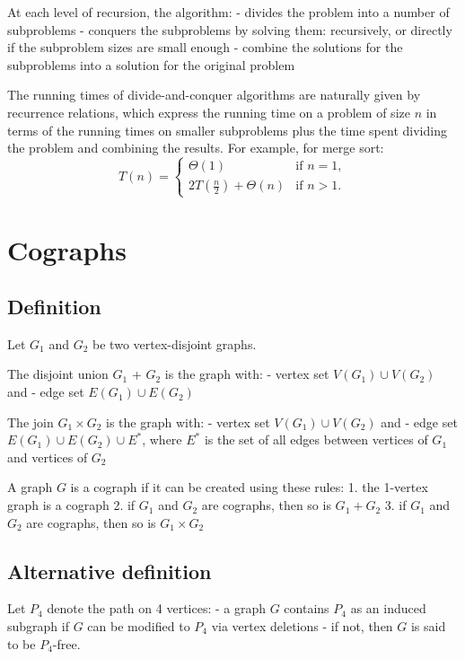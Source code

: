 \documentclass[11pt]{article}
\begin{document}
At each level of recursion, the algorithm: - divides the problem into a
number of subproblems - conquers the subproblems by solving them:
recursively, or directly if the subproblem sizes are small enough -
combine the solutions for the subproblems into a solution for the
original problem

The running times of divide-and-conquer algorithms are naturally given
by recurrence relations, which express the running time on a problem of
size \(n\) in terms of the running times on smaller subproblems plus the
time spent dividing the problem and combining the results. For example,
for merge sort: \[
T(n) =
\begin{cases} 
\Theta(1) & \text{if } n = 1, \\
2T\left(\frac{n}{2}\right) + \Theta(n) & \text{if } n > 1.
\end{cases}
\]

    \section{Cographs}\label{cographs}

\subsection{Definition}\label{definition}

Let \(G_1\) and \(G_2\) be two vertex-disjoint graphs.

The disjoint union \(G_1\) + \(G_2\) is the graph with: - vertex set
\(V(G_1) \cup V(G_2)\) and - edge set \(E(G_1) \cup E(G_2)\)

The join \(G_1 \times G_2\) is the graph with: - vertex set
\(V(G_1) \cup V(G_2)\) and - edge set \(E(G_1) \cup E(G_2) \cup E^*\),
where \(E^*\) is the set of all edges between vertices of \(G_1\) and
vertices of \(G_2\)

A graph \(G\) is a cograph if it can be created using these rules: 1.
the 1-vertex graph is a cograph 2. if \(G_1\) and \(G_2\) are cographs,
then so is \(G_1 + G_2\) 3. if \(G_1\) and \(G_2\) are cographs, then so
is \(G_1 \times G_2\)

\subsection{Alternative definition}\label{alternative-definition}

Let \(P_4\) denote the path on 4 vertices: - a graph \(G\) contains
\(P_4\) as an induced subgraph if \(G\) can be modified to \(P_4\) via
vertex deletions - if not, then \(G\) is said to be \(P_4\)-free.
\end{document}
